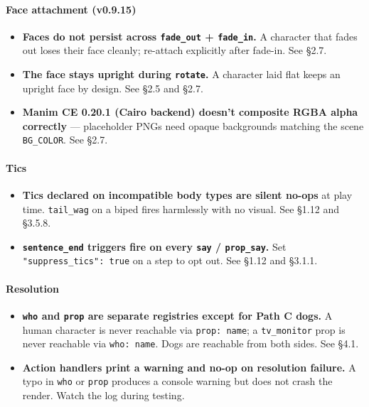 \documentclass[
  12pt,
  letterpaper,
]{book}
\providecommand{\tightlist}{%
  \setlength{\itemsep}{0pt}\setlength{\parskip}{0pt}}
\begin{document}
\paragraph{Face attachment (v0.9.15)}\label{face-attachment-v0.9.15}

\begin{itemize}
\tightlist
\item
  \textbf{Faces do not persist across \texttt{fade\_out} +
  \texttt{fade\_in}.} A character that fades out loses their face
  cleanly; re-attach explicitly after fade-in. See §2.7.
\item
  \textbf{The face stays upright during \texttt{rotate}.} A character
  laid flat keeps an upright face by design. See §2.5 and §2.7.
\item
  \textbf{Manim CE 0.20.1 (Cairo backend) doesn't composite RGBA alpha
  correctly} --- placeholder PNGs need opaque backgrounds matching the
  scene \texttt{BG\_COLOR}. See §2.7.
\end{itemize}

\paragraph{Tics}\label{tics}

\begin{itemize}
\tightlist
\item
  \textbf{Tics declared on incompatible body types are silent no-ops} at
  play time. \texttt{tail\_wag} on a biped fires harmlessly with no
  visual. See §1.12 and §3.5.8.
\item
  \textbf{\texttt{sentence\_end} triggers fire on every \texttt{say} /
  \texttt{prop\_say}.} Set \texttt{"suppress\_tics":\ true} on a step to
  opt out. See §1.12 and §3.1.1.
\end{itemize}

\paragraph{Resolution}\label{resolution}

\begin{itemize}
\tightlist
\item
  \textbf{\texttt{who} and \texttt{prop} are separate registries except
  for Path C dogs.} A human character is never reachable via
  \texttt{prop:\ name}; a \texttt{tv\_monitor} prop is never reachable
  via \texttt{who:\ name}. Dogs are reachable from both sides. See §4.1.
\item
  \textbf{Action handlers print a warning and no-op on resolution
  failure.} A typo in \texttt{who} or \texttt{prop} produces a console
  warning but does not crash the render. Watch the log during testing.
\end{itemize}
\end{document}
